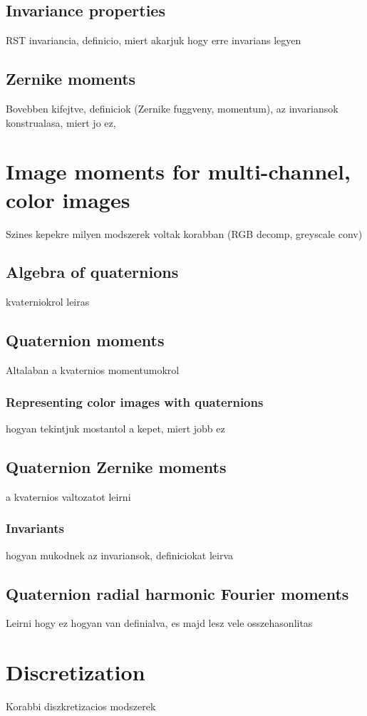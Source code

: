 \subsection{Invariance properties}
RST invariancia, definicio, miert akarjuk hogy erre invarians legyen
\subsection{Zernike moments}
Bovebben kifejtve, definiciok (Zernike fuggveny, momentum), az invariansok konstrualasa, miert jo ez,


\section{Image moments for multi-channel, color images}
Szines kepekre milyen modszerek voltak korabban (RGB decomp, greyscale conv)

\subsection{Algebra of quaternions}
kvaterniokrol leiras

\subsection{Quaternion moments}
Altalaban a kvaternios momentumokrol
\subsubsection{Representing color images with quaternions}
hogyan tekintjuk mostantol a kepet, miert jobb ez

\subsection{Quaternion Zernike moments}
a kvaternios valtozatot leirni
\subsubsection{Invariants}
hogyan mukodnek az invariansok, definiciokat leirva

\subsection{Quaternion radial harmonic Fourier moments}
Leirni hogy ez hogyan van definialva, es majd lesz vele osszehasonlitas


\section{Discretization}
Korabbi diszkretizacios modszerek
